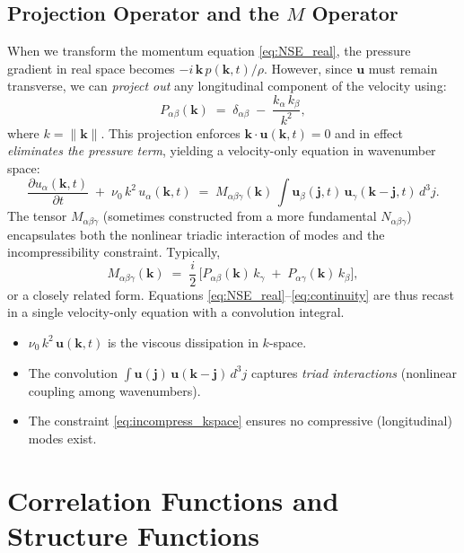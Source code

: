 \documentclass[12pt,a4paper]{article}
\newcommand\ub{\mathbf{u}}   %
\newcommand\pb{p}           %
\newcommand\kvec{\mathbf{k}} %
\begin{document}
\subsection{Projection Operator and the \boldmath$M$ Operator}
When we transform the momentum equation \eqref{eq:NSE_real}, the pressure gradient in real space becomes \(-i\,\kvec\,\pb(\kvec,t)/\rho\).  However, since \(\ub\) must remain transverse, we can \emph{project out} any longitudinal component of the velocity using:
\begin{equation}
P_{\alpha\beta}(\kvec)
\;=\;
\delta_{\alpha\beta}
\;-\;
\frac{k_\alpha\,k_\beta}{k^2},
\end{equation}
where \(k = \|\kvec\|\).  This projection enforces \(\kvec\cdot\ub(\kvec,t)=0\) and in effect \emph{eliminates the pressure term}, yielding a velocity-only equation in wave\-number space:
\begin{equation}
  \frac{\partial u_\alpha(\kvec,t)}{\partial t}
  \;+\;\nu_0\,k^2\,u_\alpha(\kvec,t)
  \;=\;
  M_{\alpha\beta\gamma}(\kvec)
  \,\int \ub_\beta(\mathbf{j},t)\,\ub_\gamma(\kvec-\mathbf{j},t)\,d^3j.
\label{eq:NSE_kspace}
\end{equation}
The tensor \(M_{\alpha\beta\gamma}\) (sometimes constructed from a more fundamental \(N_{\alpha\beta\gamma}\)) encapsulates both the nonlinear triadic interaction of modes and the incompressibility constraint.  Typically,
\begin{equation}
M_{\alpha\beta\gamma}(\kvec)
\;=\;
\frac{i}{2}\,\bigl[P_{\alpha\beta}(\kvec)\,k_\gamma
\;+\;P_{\alpha\gamma}(\kvec)\,k_\beta \bigr],
\end{equation}
or a closely related form.  Equations \eqref{eq:NSE_real}--\eqref{eq:continuity} are thus recast in a single velocity-only equation with a convolution integral.

\begin{itemize}
\item \(\nu_0\,k^2\,\ub(\kvec,t)\) is the viscous dissipation in \(k\)-space.
\item The convolution \(\int \ub(\mathbf{j})\,\ub(\kvec-\mathbf{j})\,d^3j\) captures \emph{triad interactions} (nonlinear coupling among wavenumbers).
\item The constraint \eqref{eq:incompress_kspace} ensures no compressive (longitudinal) modes exist.
\end{itemize}

\section{Correlation Functions and Structure Functions}
\end{document}
